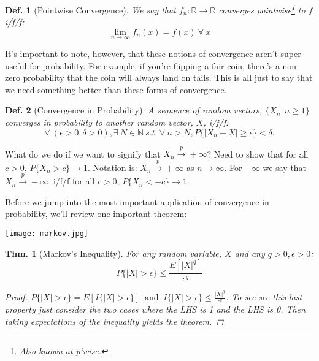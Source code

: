 \documentclass{tufte-book}
\theoremstyle{mytheoremstyle}
\newtheorem*{thm}{Thm.}
\theoremstyle{mylemstyle}
\theoremstyle{mydefstyle}
\newtheorem*{mydef}{Def.}
\begin{document}
\begin{mydef}[Pointwise Convergence]
	We say that \(f_n: \mathbb{R} \rightarrow \mathbb{R}\) converges pointwise\footnote{Also known at p'wise.} to \(f\) i/f/f:
		\[\lim_{n \rightarrow \infty} f_n(x) = f(x)\ \forall\ x\]
\end{mydef}
It's important to note, however, that these notions of convergence aren't super useful for probability. For example, if you're flipping a fair coin, there's a non-zero probability that the coin will always land on tails. This is all just to say that we need something better than these forms of convergence. 

\begin{mydef}[Convergence in Probability] A sequence of random vectors, \(\{X_n: n \ge 1\}\) converges in probability to another random vector, \(X\), i/f/f:
	\[\forall\ (\epsilon > 0, \delta > 0), \exists\ N \in \mathbb{N}\ s.t.\ \forall\ n > N, P\{|X_n - X| \ge \epsilon\} < \delta \text{.}\]
\end{mydef}
What do we do if we want to signify that \(X_n \overset{p}{\rightarrow} +\infty\)? Need to show that for all \(c > 0\), \(P\{X_n > c\} \rightarrow 1\). Notation is: \(X_n \overset{p}{\rightarrow} + \infty\) as \(n \rightarrow \infty\). For \(-\infty\) we say that \(X_n \overset{p}{\rightarrow} -\infty\ \) i/f/f for all \(c > 0\), \(P\{X_n < -c\} \rightarrow 1\). 

Before we jump into the most important application of convergence in probability, we'll review one important theorem: \begin{marginfigure} \texttt{[image: markov.jpg]} \caption{Andrey Markov pondering his inequality.} \end{marginfigure}
\begin{thm}[Markov's Inequality] For any random variable, \(X\) and any \(q > 0, \epsilon > 0\):
	\[P\{|X| > \epsilon\} \le \frac{E\left[|X|^q\right]}{\epsilon^q} \]
	\begin{proof} 
		\(P\{|X| > \epsilon \} = E[I\{|X| > \epsilon\}]\ \text{ and }\ I\{|X| > \epsilon\} \le \frac{|X|^q}{\epsilon^q}\). To see see this last property just consider the two cases where the LHS is 1 and the LHS is 0. Then taking expectations of the inequality yields the theorem. 
	\end{proof}
\end{thm}
\end{document}
